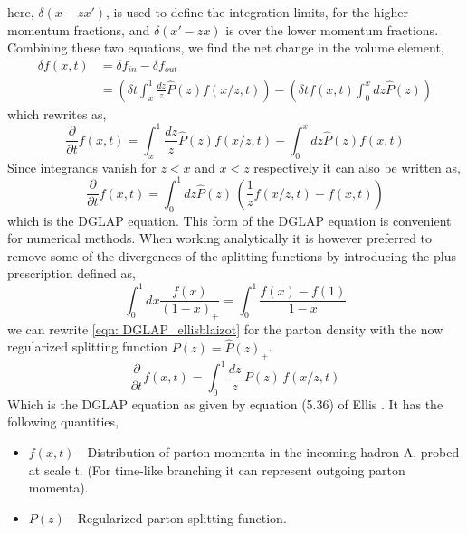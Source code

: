 \documentclass[main.tex]{subfiles}
\begin{document}
here, \(\delta(x-zx')\), is used to define the integration limits, for the higher momentum fractions, and \(\delta(x'-zx)\) is over the lower momentum fractions. 
Combining these two equations, we find the net change in the volume element, 
\begin{align} %
    \delta f(x,t) &= \delta f_{in} - \delta f_{out} \nonumber \\
    &= \left( \delta t \int_x^1 \frac{dz}{z} \hat{P}(z) f(x/z,t) \right) - \left( \delta t f(x,t) \int_0^x dz \hat{P}(z) \right)
\end{align}
which rewrites as,
\begin{equation}\label{eqn: DGLAP_ellisblaizot_with_limits}
    \frac{\partial}{\partial t} f(x,t) = \int_x^1 \frac{dz}{z} \hat{P}(z) f(x/z,t) - \int_0^x dz \hat{P}(z) f(x,t) 
\end{equation}
Since integrands vanish for \(z<x\) and \(x<z\) respectively it can also be written as, 
\begin{equation}\label{eqn: DGLAP_ellisblaizot}
    \frac{\partial}{\partial t} f(x,t) = \int_0^1 dz \hat{P}(z) \, \left( \frac{1}{z} f(x/z,t) - f(x,t) \right)
\end{equation}
which is the DGLAP equation. This form of the DGLAP equation is convenient for numerical methods. When working analytically it is however preferred to remove some of the divergences of the splitting functions by introducing the plus prescription defined as,
\begin{equation}\label{eqn: ellis_plusprescription}
    \int_0^1 dx \frac{f(x)}{(1-x)_+} = \int_0^1 \frac{f(x)-f(1)}{1-x}
\end{equation}
we can rewrite \autoref{eqn: DGLAP_ellisblaizot} for the parton density with the now regularized splitting function \(P(z) = \hat P(z)_+\).
\begin{equation}\label{eqn: dglap_ellis_style}
    \frac{\partial }{\partial t} f(x,t) = \int_0^1 \frac{dz}{z} \, P(z) \, f(x/z, t)
\end{equation}
Which is the DGLAP equation as given by equation (5.36) of Ellis \cite{ellis_stirling_webber_1996}.
It has the following quantities, 
\begin{itemize}
    \item \(f(x,t)\) - Distribution of parton momenta in the incoming hadron A, probed at scale t. (For time-like branching it can represent outgoing parton momenta).
    \item \(P(z)\) - Regularized parton splitting function.
\end{itemize}
\end{document}
